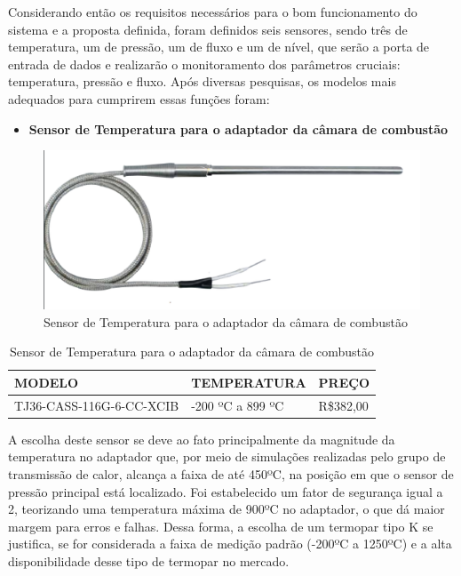 Considerando então os requisitos necessários para o bom funcionamento do sistema e a proposta definida, foram definidos seis sensores, sendo três de temperatura, um de pressão, um de fluxo e um de nível, que serão a porta de entrada de dados e realizarão o monitoramento dos parâmetros cruciais: temperatura, pressão e fluxo. Após diversas pesquisas, os modelos mais adequados para cumprirem essas funções foram:
\newpage
\begin{itemize}
    \item \textbf{Sensor de Temperatura para o adaptador da câmara de combustão}
\end{itemize}
\begin{figure}[!htb]                  
	\centering                          
	\includegraphics[scale=0.5]{figuras/Sensor1.eps}
	\caption{ Sensor de Temperatura para o adaptador da câmara de combustão } \label{figsensor1}        
\end{figure}

\begin{table}[!h]
    \centering
    \begin{tabular}{|p{5cm}|p{5cm}|p{5cm}|}
    \hline
    \textbf{MODELO} & \textbf{TEMPERATURA}    & \textbf{PREÇO}  \\ \hline
    TJ36-CASS-116G-6-CC-XCIB      & -200 ºC a 899 ºC &  R\$382,00  \\ \hline
    \end{tabular}
    \caption{Sensor de Temperatura para o adaptador da câmara de combustão}
    \end{table}

A escolha deste sensor se deve ao fato principalmente da magnitude da temperatura no adaptador que, por meio de simulações realizadas pelo grupo de transmissão de calor, alcança a faixa de até 450ºC, na posição em que o sensor de pressão principal está localizado. Foi estabelecido um fator de segurança igual a 2, teorizando uma temperatura máxima de 900ºC no adaptador, o que dá maior margem para erros e falhas. Dessa forma, a escolha de um termopar tipo K se justifica, se for considerada a faixa de medição padrão (-200ºC a 1250ºC) e a alta disponibilidade desse tipo de termopar no mercado.

